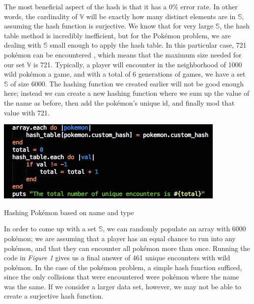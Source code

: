 \documentclass{article}
\begin{document}
\indent The most beneficial aspect of the hash is that it has a 0\% error rate. 
In other words, the cardinality of $\mathbb{V}$ will be exactly how many distinct elements are in $\mathbb{S}$, assuming the hash function is surjective. 
We know that for very large $\mathbb{S}$, the hash table method is incredibly inefficient, but for the Pok\'emon problem, we are dealing with $\mathbb{S}$ small enough to apply the hash table. 
In this particular case, 721 pok\'emon can be encountered \cite{Pokemon}, which means that the maximum size needed for our set $\mathbb{V}$ is 721. 
Typically, a player will encounter in the neighborhood of 1000 wild pok\'emon a game, and with a total of 6 generations of games, we have a set $\mathbb{S}$ of size 6000. 
The hashing function we created earlier will not be good enough here; instead we can create a new hashing function where we sum up the value of the name as before, then add the pok\'emon's unique id, and finally mod that value with 721.
\begin{floatingfigure}[H!]{8cm}
\centering
\begin{framed}
\includegraphics[scale=0.4]{pkmn_problem/hash_01}
\caption{Hashing Pok\'emon based on name and type}
\end{framed}
\end{floatingfigure}
\noindent In order to come up with a set $\mathbb{S}$, we can randomly populate an array with 6000 pok\'emon; we are assuming that a player has an equal chance to run into any pok\'emon, and that they can encounter all pok\'emon more than once.
Running the code in \textit{Figure 1} gives us a final answer of 461 unique encounters with wild pok\'emon. 
In the case of the pok\'emon problem, a simple hash function sufficed, since the only collisions that were encountered were pok\'emon where the name was the same. 
If we consider a larger data set, however, we may not be able to create a surjective hash function.\\
\end{document}

